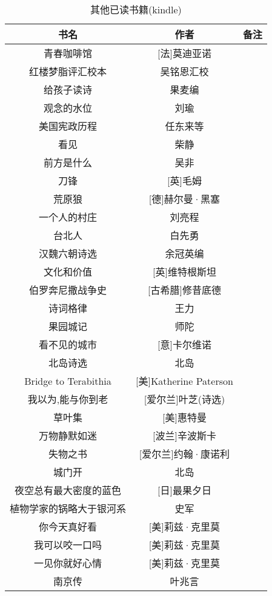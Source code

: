 \documentclass[UTF8,12pt]{ctexart}
\begin{document}
\begin{table}[h]
\centering
\begin{tabular}{ccc}
\toprule
书名&作者&备注\\
\midrule
青春咖啡馆&[法]莫迪亚诺\\
红楼梦脂评汇校本&吴铭恩汇校\\
给孩子读诗&果麦编\\
观念的水位&刘瑜\\
美国宪政历程&任东来等\\
看见&柴静\\
前方是什么&吴非\\
刀锋&[英]毛姆\\
荒原狼&[德]赫尔曼·黑塞\\
一个人的村庄&刘亮程\\
台北人&白先勇\\
汉魏六朝诗选&余冠英编\\
文化和价值&[英]维特根斯坦\\
伯罗奔尼撒战争史&[古希腊]修昔底德\\
诗词格律&王力\\
果园城记&师陀\\
看不见的城市&[意]卡尔维诺\\
北岛诗选&北岛\\
Bridge to Terabithia&[美]Katherine Paterson\\
我以为,能与你到老&[爱尔兰]叶芝(诗选)\\
草叶集&[美]惠特曼\\
万物静默如迷&[波兰]辛波斯卡\\
失物之书&[爱尔兰]约翰·康诺利\\
城门开&北岛\\
夜空总有最大密度的蓝色&[日]最果夕日\\
植物学家的锅略大于银河系&史军\\
你今天真好看&[美]莉兹·克里莫\\
我可以咬一口吗&[美]莉兹·克里莫\\
一见你就好心情&[美]莉兹·克里莫\\
南京传&叶兆言\\
\bottomrule
\end{tabular}
\caption{其他已读书籍(kindle)}
\end{table}
\end{document}
